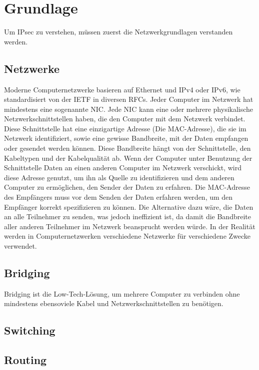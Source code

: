 \section{Grundlage}
Um IPsec zu verstehen, müssen zuerst die Netzwerkgrundlagen verstanden werden.
\subsection{Netzwerke}
Moderne Computernetzwerke basieren auf Ethernet und \ac{IPv4} oder \ac{IPv6}, wie standardisiert
von der \ac{IETF} in diversen \acp{RFC}.
Jeder Computer im Netzwerk hat mindestens eine sogenannte \ac{NIC}.
Jede \ac{NIC} kann eine oder mehrere physikalische Netzwerkschnittstellen haben,
die den Computer mit dem Netzwerk verbindet. Diese Schnittstelle hat eine einzigartige
Adresse (Die MAC-Adresse), die sie im Netzwerk identifiziert, sowie eine gewisse Bandbreite, mit
der Daten empfangen oder gesendet werden können. Diese Bandbreite hängt von der Schnittstelle, den Kabeltypen und der Kabelqualität ab.
Wenn der Computer unter Benutzung der Schnittstelle Daten an einen anderen Computer im Netzwerk verschickt, wird diese Adresse genutzt, um ihn als
Quelle zu identifizieren und dem anderen Computer zu ermöglichen, den Sender der Daten zu erfahren.
Die MAC-Adresse des Empfängers muss vor dem Senden der Daten erfahren werden, um den Empfänger korrekt spezifizieren zu können.
Die Alternative dazu wäre, die Daten an alle Teilnehmer zu senden, was jedoch ineffizient ist, da
damit die Bandbreite aller anderen Teilnehmer im Netzwerk beansprucht werden würde.
In der Realität werden in Computernetzwerken verschiedene Netzwerke für verschiedene Zwecke verwendet.
\subsection{Bridging}
Bridging ist die Low-Tech-Lösung, um mehrere Computer zu verbinden ohne mindestens ebensoviele
Kabel und Netzwerkschnittstellen zu benötigen.

\subsection{Switching}
\subsection{Routing}
